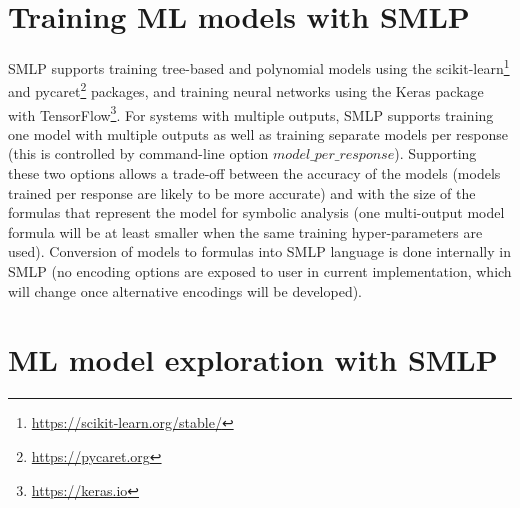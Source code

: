 \documentclass[a4paper,parskip=half]{article} %
\begin{document}
\section{Training ML models with SMLP}\label{sec:models}

SMLP supports training tree-based and polynomial models using the scikit-learn\footnote{\url{https://scikit-learn.org/stable/}} 
and pycaret\footnote{\url{https://pycaret.org}} packages, 
and training neural networks using the Keras package with TensorFlow\footnote{\url{https://keras.io}}. 
For systems with multiple outputs, SMLP supports training one model with multiple outputs as well as training separate models per response 
(this is controlled by command-line option $model\_per\_response$). Supporting these two options allows a trade-off between the accuracy 
of the models (models trained per response are likely to be more accurate) and with the size of the formulas that represent the model for 
symbolic analysis (one multi-output model formula will be at least smaller when the same training hyper-parameters are used). 
Conversion of models to formulas into SMLP language is done internally in SMLP (no encoding options are exposed to user in current 
implementation, which will change once alternative encodings will be developed).



\section{ML model exploration with SMLP}\label{sec:exploration}
\end{document}
